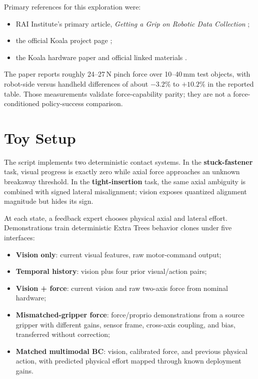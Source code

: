 \documentclass[11pt]{article}
\begin{document}
Primary references for this exploration were:
\begin{itemize}[leftmargin=1.5em]
  \item RAI Institute's primary article, \emph{Getting a Grip on Robotic Data Collection} \cite{article};
  \item the official Koala project page \cite{koala};
  \item the Koala hardware paper and official linked materials \cite{paper}.
\end{itemize}

The paper reports roughly 24--27\,N pinch force over 10--40\,mm test objects, with robot-side versus handheld differences of about $-3.2\%$ to $+10.2\%$ in the reported table. Those measurements validate force-capability parity; they are not a force-conditioned policy-success comparison.

\section{Toy Setup}

The script implements two deterministic contact systems. In the \textbf{stuck-fastener} task, visual progress is exactly zero while axial force approaches an unknown breakaway threshold. In the \textbf{tight-insertion} task, the same axial ambiguity is combined with signed lateral misalignment; vision exposes quantized alignment magnitude but hides its sign.

At each state, a feedback expert chooses physical axial and lateral effort. Demonstrations train deterministic Extra Trees behavior clones under five interfaces:
\begin{itemize}[leftmargin=1.5em]
  \item \textbf{Vision only}: current visual features, raw motor-command output;
  \item \textbf{Temporal history}: vision plus four prior visual/action pairs;
  \item \textbf{Vision + force}: current vision and raw two-axis force from nominal hardware;
  \item \textbf{Mismatched-gripper force}: force/proprio demonstrations from a source gripper with different gains, sensor frame, cross-axis coupling, and bias, transferred without correction;
  \item \textbf{Matched multimodal BC}: vision, calibrated force, and previous physical action, with predicted physical effort mapped through known deployment gains.
\end{itemize}
\end{document}
